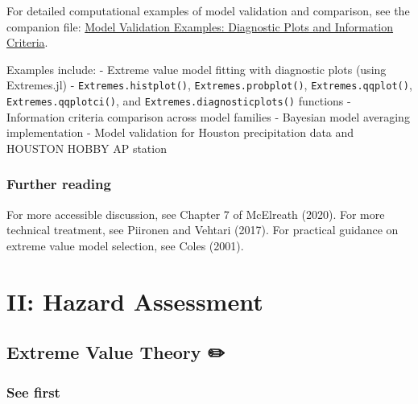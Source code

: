 \documentclass[
  letterpaper,
  DIV=11,
  numbers=noendperiod]{scrreprt}
\begin{document}
\begin{tcolorbox}[enhanced jigsaw, arc=.35mm, breakable, title=\textcolor{quarto-callout-tip-color}{\faLightbulb}\hspace{0.5em}{Computational examples}, coltitle=black, opacityback=0, bottomtitle=1mm, colback=white, left=2mm, opacitybacktitle=0.6, toptitle=1mm, colframe=quarto-callout-tip-color-frame, leftrule=.75mm, titlerule=0mm, rightrule=.15mm, bottomrule=.15mm, colbacktitle=quarto-callout-tip-color!10!white, toprule=.15mm]

For detailed computational examples of model validation and comparison,
see the companion file:
\href{./chapters/fundamentals/model-comparison-examples.qmd}{Model
Validation Examples: Diagnostic Plots and Information Criteria}.

Examples include: - Extreme value model fitting with diagnostic plots
(using Extremes.jl) - \texttt{Extremes.histplot()},
\texttt{Extremes.probplot()}, \texttt{Extremes.qqplot()},
\texttt{Extremes.qqplotci()}, and \texttt{Extremes.diagnosticplots()}
functions - Information criteria comparison across model families -
Bayesian model averaging implementation - Model validation for Houston
precipitation data and HOUSTON HOBBY AP station

\end{tcolorbox}

\section*{Further reading}\label{further-reading-6}


For more accessible discussion, see Chapter 7 of McElreath (2020). For
more technical treatment, see Piironen and Vehtari (2017). For practical
guidance on extreme value model selection, see Coles (2001).

\part{\textbf{II: Hazard Assessment}}

\chapter{Extreme Value Theory ✏️}\label{extreme-value-theory}

\section*{See first}\label{see-first-5}
\end{document}
